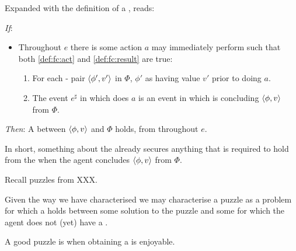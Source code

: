 \begin{note}
  \noindent%
  Expanded with the definition of a \fc{}, \supportII{} reads:
  \begin{itenum}
  \item[\emph{If}:]
    \begin{itemize}
    \item
      Throughout \(e\) there is some action \(a\) \vAgent{} may immediately perform such that both \ref{def:fc:act} and \ref{def:fc:result} are true:
      \begin{enumerate}[label=\alph*., ref=(\alph*)]
      \item
        For each - pair \(\langle \phi', v' \rangle\) in \(\Phi\), \vAgent{} \evals{} \(\phi'\) as having value \(v'\) prior to doing \(a\).

      \item
        The event \(e^{\sharp}\) in which \vAgent{} does \(a\) is an event in which \vAgent{} is concluding \(\langle \phi, v \rangle\) from \(\Phi\).
      \end{enumerate}
    \end{itemize}
  \item[\emph{Then}:]
    A \ros{} between \(\langle \phi, v \rangle\) and \(\Phi\) holds, from  throughout \(e\).
  \end{itenum}

  \noindent%
  In short, something about the  already secures anything that is required to hold from the \agpe{} when the agent concludes \(\langle \phi, v \rangle\) from \(\Phi\).
\end{note}

\begin{note}
  Recall puzzles from XXX.

  Given the way we have characterised \ros{} we may characterise a puzzle as a problem for which a \ros{} holds between some solution to the puzzle and some \pool{} for which the agent does not (yet) have a \wit{}.

  A good puzzle is when obtaining a \wit{} is enjoyable.
\end{note}


